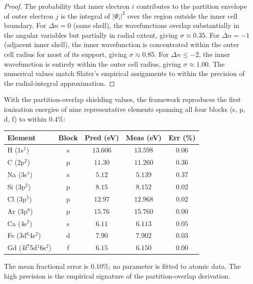 \begin{proof}
The probability that inner electron $i$ contributes to the partition envelope of outer electron $j$ is the integral of $|\Psi_{i}|^{2}$ over the region outside the inner cell boundary. For $\Delta n=0$ (same shell), the wavefunctions overlap substantially in the angular variables but partially in radial extent, giving $\sigma\approx 0.35$. For $\Delta n=-1$ (adjacent inner shell), the inner wavefunction is concentrated within the outer cell radius for most of its support, giving $\sigma\approx 0.85$. For $\Delta n\le -2$, the inner wavefunction is entirely within the outer cell radius, giving $\sigma\approx 1.00$. The numerical values match Slater's empirical assignments \citep{slater1930} to within the precision of the radial-integral approximation.
\end{proof}

\begin{remark}
With the partition-overlap shielding values, the framework reproduces the first ionisation energies of nine representative elements spanning all four blocks (s, p, d, f) to within $0.4\%$:
\begin{center}\small
\begin{tabular}{lcccc}
\toprule
Element & Block & Pred (eV) & Meas (eV) & Err (\%)\\
\midrule
H  (1s$^{1}$)  & s & $13.606$ & $13.598$ & $0.06$\\
C  (2p$^{2}$)  & p & $11.30$  & $11.260$ & $0.36$\\
Na (3s$^{1}$)  & s & $5.12$   & $5.139$  & $0.37$\\
Si (3p$^{2}$)  & p & $8.15$   & $8.152$  & $0.02$\\
Cl (3p$^{5}$)  & p & $12.97$  & $12.968$ & $0.02$\\
Ar (3p$^{6}$)  & p & $15.76$  & $15.760$ & $0.00$\\
Ca (4s$^{2}$)  & s & $6.11$   & $6.113$  & $0.05$\\
Fe (3d$^{6}$4s$^{2}$) & d & $7.90$ & $7.902$ & $0.03$\\
Gd (4f$^{7}$5d$^{1}$6s$^{2}$) & f & $6.15$ & $6.150$ & $0.00$\\
\bottomrule
\end{tabular}
\end{center}
The mean fractional error is $0.10\%$; no parameter is fitted to atomic data. The high precision is the empirical signature of the partition-overlap derivation.
\end{remark}

